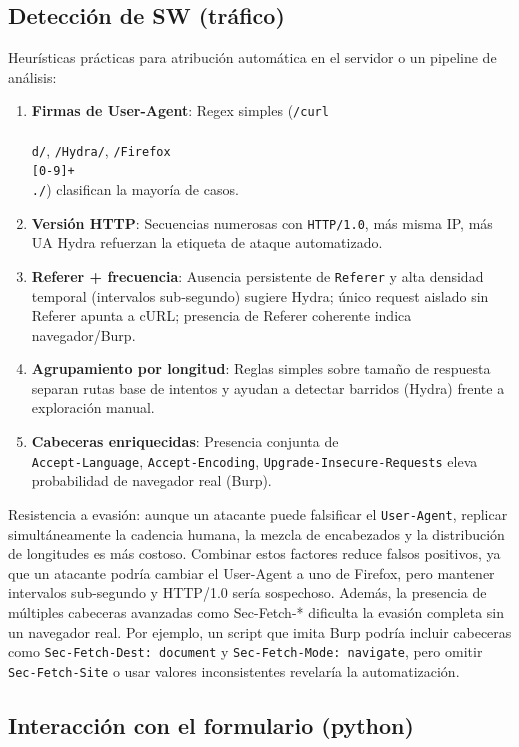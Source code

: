 \documentclass[letterpaper,12pt]{article}
\let\origsubsection\subsection
\renewcommand{\subsection}{\FloatBarrier\origsubsection}
\begin{document}
\subsection{Detección de SW (tráfico)}
Heurísticas prácticas para atribución automática en el servidor o un pipeline de análisis:
\begin{enumerate}
    \item \textbf{Firmas de User-Agent}: Regex simples (\texttt{/curl\\\/\\d/}, \texttt{/Hydra/}, \texttt{/Firefox\\\/[0-9]+\\./}) clasifican la mayoría de casos.
    \item \textbf{Versión HTTP}: Secuencias numerosas con \texttt{HTTP/1.0}, más misma IP, más UA Hydra refuerzan la etiqueta de ataque automatizado.
    \item \textbf{Referer + frecuencia}: Ausencia persistente de \texttt{Referer} y alta densidad temporal (intervalos sub‑segundo) sugiere Hydra; único request aislado sin Referer apunta a cURL; presencia de Referer coherente indica navegador/Burp.
    \item \textbf{Agrupamiento por longitud}: Reglas simples sobre tamaño de respuesta separan rutas base de intentos y ayudan a detectar barridos (Hydra) frente a exploración manual.
    \item \textbf{Cabeceras enriquecidas}: Presencia conjunta de \\ \texttt{Accept-Language}, \texttt{Accept-Encoding}, \texttt{Upgrade-Insecure-Requests} eleva probabilidad de navegador real (Burp).
\end{enumerate}
Resistencia a evasión: aunque un atacante puede falsificar el \texttt{User-Agent}, replicar simultáneamente la cadencia humana, la mezcla de encabezados y la distribución de longitudes es más costoso. Combinar estos factores reduce falsos positivos, ya que un atacante podría cambiar el User-Agent a uno de Firefox, pero mantener intervalos sub-segundo y HTTP/1.0 sería sospechoso. Además, la presencia de múltiples cabeceras avanzadas como Sec-Fetch-* dificulta la evasión completa sin un navegador real. Por ejemplo, un script que imita Burp podría incluir cabeceras como \texttt{Sec-Fetch-Dest: document} y \texttt{Sec-Fetch-Mode: navigate}, pero omitir \texttt{Sec-Fetch-Site} o usar valores inconsistentes revelaría la automatización.

\subsection{Interacción con el formulario (python)}
\end{document}
